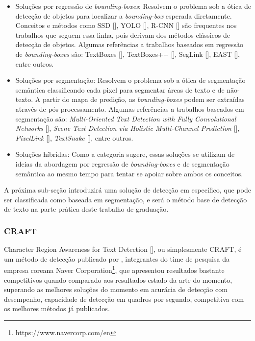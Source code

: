 \begin{itemize}
    \item Soluções por regressão de \textit{bounding-boxes}: Resolvem o problema sob a ótica de detecção de objetos para localizar a \textit{bounding-box} esperada diretamente. Conceitos e métodos como SSD [], YOLO [], R-CNN [] são frequentes nos trabalhos que seguem essa linha, pois derivam dos métodos clássicos de detecção de objetos. Algumas referências a trabalhos baseados em regressão de \textit{bounding-boxes} são: TextBoxes [], TextBoxes++ [], SegLink [], EAST [], entre outros.
    \item Soluções por segmentação: Resolvem o problema sob a ótica de segmentação semântica classificando cada pixel para segmentar áreas de texto e de não-texto. A partir do mapa de predição, as \textit{bounding-boxes} podem ser extraídas através de pós-processamento. Algumas referências a trabalhos baseados em segmentação são: \textit{Multi-Oriented Text Detection with Fully Convolutional Networks} [], \textit{Scene Text Detection via Holistic Multi-Channel Prediction} [], \textit{PixelLink} [], \textit{TextSnake} [], entre outros.
    \item Soluções híbridas: Como a categoria sugere, essas soluções se utilizam de ideias da abordagem por regressão de \textit{bounding-boxes}  e de segmentação semântica ao mesmo tempo para tentar se apoiar sobre ambos os conceitos.
\end{itemize}

A próxima sub-seção introduzirá uma solução de detecção em específico, que pode ser classificada como baseada em segmentação, e será o método base de detecção de texto na parte prática deste trabalho de graduação.


\subsubsection{CRAFT}\label{craft}
Character Region Awareness for Text Detection [], ou simplesmente CRAFT, é um método de detecção publicado por \citeauthor{CRAFT}, integrantes do time de pesquisa da empresa coreana Naver Corporation\footnote{https://www.navercorp.com/en}, que apresentou resultados bastante competitivos quando comparado aos resultados estado-da-arte do momento, superando as melhores soluções do momento em acurácia de detecção com desempenho, capacidade de detecção em quadros por segundo, competitiva com os melhores métodos já publicados.
	
